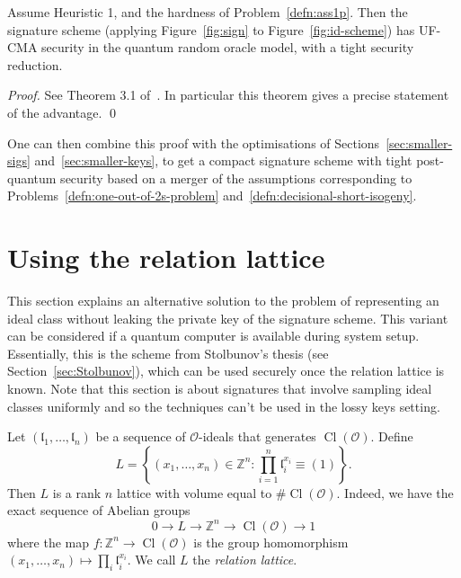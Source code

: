 \documentclass{llncs}
\newcommand{\OO}{\mathcal{O}}
\newcommand{\Z}{\mathbb{Z}}
\DeclareMathOperator{\Cl}{Cl}
\renewcommand{\l}{\mathfrak{l}}
\begin{document}
 

\begin{theorem}
Assume Heuristic 1,  and the hardness of Problem~\ref{defn:ass1p}.
Then the signature scheme (applying Figure~\ref{fig:sign} to Figure~\ref{fig:id-scheme}) has UF-CMA security in the quantum random oracle model, with a tight security reduction.
\end{theorem}
 

\begin{proof}
See Theorem 3.1 of~\cite{KLS18}.
In particular this theorem gives a precise statement of the advantage. \qed
\end{proof}


One can then combine this proof with the optimisations of Sections~\ref{sec:smaller-sigs} and~\ref{sec:smaller-keys}, to get a compact signature scheme with tight post-quantum security based on a merger of the assumptions corresponding to Problems~\ref{defn:one-out-of-2s-problem} and~\ref{defn:decisional-short-isogeny}.




\section{Using the relation lattice}\label{sec:sig-relation-lattice}

This section explains an alternative solution to the problem of representing an ideal class without leaking the private key of the signature scheme.
This variant can be considered if a quantum computer is available during system setup.
Essentially, this is the scheme from Stolbunov's thesis (see Section~\ref{sec:Stolbunov}), which can be used securely once the relation lattice is known.
Note that this section is about signatures that involve sampling ideal classes uniformly and so the techniques can't be used in the lossy keys setting.


Let $( \l_1, \dots, \l_n )$ be a sequence of $\OO$-ideals that generates $\Cl( \OO )$.
Define 
\[
   L = \left\{ (x_1, \dots, x_n ) \in \Z^n : \prod_{i=1}^n \l_i^{x_i} \equiv (1) \right\}.
\]
Then $L$ is a rank $n$ lattice with volume equal to $\#\Cl(\OO)$.
Indeed, we have the exact sequence of Abelian groups
\[
   0 \rightarrow L \rightarrow \Z^n \rightarrow \Cl( \OO ) \rightarrow 1
\]
where the map $f : \Z^n \rightarrow \Cl( \OO )$ is the group homomorphism $(x_1, \dots, x_n) \mapsto \prod_i \l_i^{x_i}$.
We call $L$ the \emph{relation lattice}.
\end{document}
